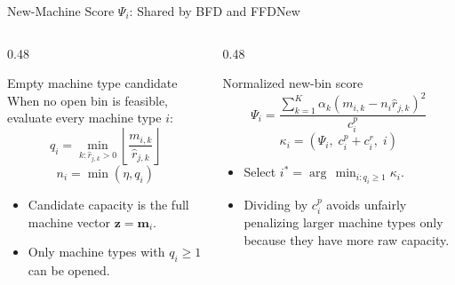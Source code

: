 \documentclass[aspectratio=169,10pt]{beamer}
\begin{document}
\begin{frame}{New-Machine Score \texorpdfstring{$\Psi_i$}{Psi}: Shared by BFD and FFDNew}
  \begin{columns}[T,totalwidth=\textwidth]
    \begin{column}{0.48\textwidth}
      \begin{block}{Empty machine type candidate}
        When no open bin is feasible, evaluate every machine type $i$:
        \[
          q_i=
          \min_{k:\hat{r}_{j,k}>0}
          \left\lfloor
            \frac{m_{i,k}}{\hat{r}_{j,k}}
          \right\rfloor
        \]
        \[
          n_i=\min(\eta,q_i)
        \]
      \end{block}
      \begin{itemize}
        \item Candidate capacity is the full machine vector $\mathbf{z}=\mathbf{m}_i$.
        \item Only machine types with $q_i\geq 1$ can be opened.
      \end{itemize}
    \end{column}
    \begin{column}{0.48\textwidth}
      \begin{block}{Normalized new-bin score}
        \[
          \Psi_i
          =
          \frac{
            \sum_{k=1}^{K}
            \alpha_k
            \left(m_{i,k}-n_i\hat{r}_{j,k}\right)^2
          }{c_i^p}
        \]
        \[
          \kappa_i =
          \left(\Psi_i,\;c_i^p+c_i^r,\;i\right)
        \]
      \end{block}
      \begin{itemize}
        \item Select $i^*=\arg\,\min_{i:q_i\geq 1}\kappa_i$.
        \item Dividing by $c_i^p$ avoids unfairly penalizing larger machine types only because they have more raw capacity.
      \end{itemize}
    \end{column}
  \end{columns}
\end{frame}
\end{document}
